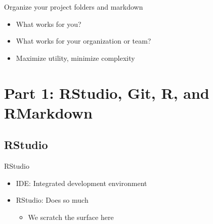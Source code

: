 \documentclass[
  ignorenonframetext,
]{beamer}
\providecommand{\tightlist}{%
  \setlength{\itemsep}{0pt}\setlength{\parskip}{0pt}}
\begin{document}
\begin{frame}{Organize your project folders and markdown}
\protect\hypertarget{organize-your-project-folders-and-markdown}{}

\begin{itemize}[<+->]
\tightlist
\item
  What works for you?
\item
  What works for your organization or team?
\item
  Maximize utility, minimize complexity
\end{itemize}

\end{frame}

\hypertarget{part-1-rstudio-git-r-and-rmarkdown}{%
\section{Part 1: RStudio, Git, R, and
RMarkdown}\label{part-1-rstudio-git-r-and-rmarkdown}}

\hypertarget{rstudio}{%
\subsection{RStudio}\label{rstudio}}

\begin{frame}{RStudio}
\protect\hypertarget{rstudio-1}{}

\begin{itemize}[<+->]
\tightlist
\item
  IDE: Integrated development environment
\item
  RStudio: Does so much

  \begin{itemize}[<+->]
  \tightlist
  \item
    We scratch the surface here
  \end{itemize}
\end{itemize}

\end{frame}
\end{document}
